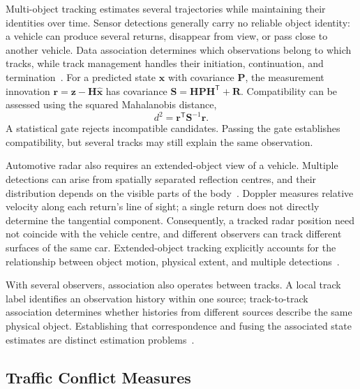 Multi-object tracking estimates several trajectories while maintaining
their identities over time. Sensor detections generally carry no reliable
object identity: a vehicle can produce several returns, disappear from
view, or pass close to another vehicle. Data association determines which
observations belong to which tracks, while track management handles their
initiation, continuation, and termination~\cite{barshalom2001estimation}.
For a predicted state $\hat{\mathbf{x}}$ with covariance $\mathbf{P}$,
the measurement innovation $\mathbf{r}=\mathbf{z}-\mathbf{H}\hat{\mathbf{x}}$
has covariance $\mathbf{S}=\mathbf{H}\mathbf{P}\mathbf{H}^{\mathsf T}+\mathbf{R}$.
Compatibility can be assessed using the squared Mahalanobis distance,
\begin{equation}
  d^2=\mathbf{r}^{\mathsf T}\mathbf{S}^{-1}\mathbf{r}.
  \label{eq:association-distance}
\end{equation}
A statistical gate rejects incompatible candidates. Passing the gate
establishes compatibility, but several tracks may still explain the same
observation.

Automotive radar also requires an extended-object view of a vehicle.
Multiple detections can arise from spatially separated reflection centres,
and their distribution depends on the visible parts of the
body~\cite{hammarstrand2012extended}. Doppler measures relative velocity along each
return's line of sight; a single return does not directly determine the
tangential component. Consequently, a tracked radar position need not
coincide with the vehicle centre, and different observers can track
different surfaces of the same car. Extended-object tracking explicitly
accounts for the relationship between object motion, physical extent,
and multiple detections~\cite{granstrom2017extended}.

With several observers, association also operates between tracks.
A local track label identifies an observation history within one source;
track-to-track association determines whether histories from different
sources describe the same physical object. Establishing that correspondence
and fusing the associated state estimates are distinct estimation
problems~\cite{chong2000association}.

\subsection{Traffic Conflict Measures}
\label{subsec:traffic-conflicts}

